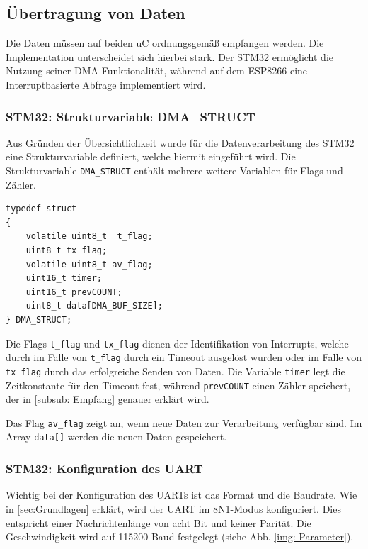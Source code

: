 \subsection{Übertragung von Daten}

Die Daten müssen auf beiden \ac{uC} ordnungsgemäß empfangen werden. Die Implementation unterscheidet sich hierbei stark. Der STM32 ermöglicht
die Nutzung seiner \ac{DMA}-Funktionalität, während auf dem ESP8266 eine Interruptbasierte Abfrage implementiert wird.

\subsubsection{STM32: Strukturvariable DMA\_STRUCT}

Aus Gründen der Übersichtlichkeit wurde für die Datenverarbeitung des STM32 eine Strukturvariable definiert, welche hiermit eingeführt wird.
Die Strukturvariable \lstinline!DMA_STRUCT! enthält mehrere weitere Variablen für Flags und Zähler.

\begin{lstlisting}[caption={\textit{DMA Strukturvariable}}]
typedef struct
{
    volatile uint8_t  t_flag;   
    uint8_t tx_flag;	
    volatile uint8_t av_flag;		
    uint16_t timer;             
    uint16_t prevCOUNT;      
    uint8_t data[DMA_BUF_SIZE];   
} DMA_STRUCT;
\end{lstlisting}

Die Flags \lstinline!t_flag! und \lstinline!tx_flag! dienen der Identifikation von Interrupts, welche durch im Falle von \lstinline!t_flag! durch ein
Timeout ausgelöst wurden oder im Falle von \lstinline!tx_flag! durch das erfolgreiche Senden von Daten. Die Variable \lstinline!timer! legt 
die Zeitkonstante für den Timeout fest, während \lstinline!prevCOUNT! einen Zähler speichert, der in \ref{subsub: Empfang} genauer erklärt wird.  

Das Flag \lstinline!av_flag! zeigt an, wenn neue Daten zur Verarbeitung verfügbar sind. Im Array \lstinline!data[]! werden die neuen Daten gespeichert.

\subsubsection{STM32: Konfiguration des UART}
Wichtig bei der Konfiguration des \acp{UART} ist das Format und die Baudrate. Wie in \ref{sec:Grundlagen} erklärt, wird der \ac{UART} im 8N1-Modus
konfiguriert. Dies entspricht einer Nachrichtenlänge von acht Bit und keiner Parität. Die Geschwindigkeit wird auf 115200 Baud festgelegt (siehe Abb. \ref{img: Parameter}). 

